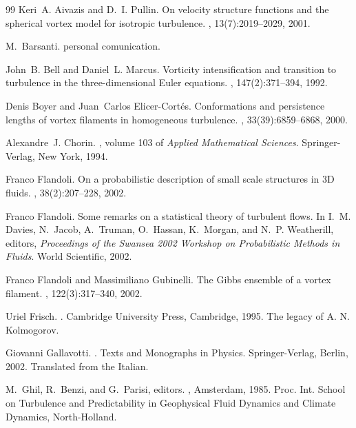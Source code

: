 \documentclass[a4paper,12pt]{article}
\begin{document}
\begin{thebibliography}{99}
Keri~A. Aivazis and D.~I. Pullin. \newblock On velocity
structure functions and the spherical vortex model for isotropic turbulence.
, 13(7):2019--2029, 2001.

M.~Barsanti. \newblock personal comunication.

John~B. Bell and Daniel~L. Marcus. \newblock Vorticity
intensification and transition to turbulence in the three-dimensional {E}uler
equations. , 147(2):371--394, 1992.

Denis Boyer and Juan~Carlos Elicer-Cort{\'{e}}s. \newblock
Conformations and persistence lengths of vortex filaments in homogeneous
turbulence. , 33(39):6859--6868, 2000.

Alexandre~J. Chorin. ,
volume 103 of \emph{Applied Mathematical Sciences}. \newblock Springer-Verlag,
New York, 1994.

Franco Flandoli. \newblock On a probabilistic description of
small scale structures in 3{D} fluids. , 38(2):207--228, 2002.

Franco Flandoli. \newblock Some remarks on a statistical theory
of turbulent flows. \newblock In I.~M. Davies, N.~Jacob, A.~Truman, O.~Hassan,
K.~Morgan, and N.~P. Weatherill, editors, \emph{Proceedings of the Swansea
2002 Workshop on Probabilistic Methods in Fluids}. World Scientific, 2002.

Franco Flandoli and Massimiliano Gubinelli. \newblock The
{G}ibbs ensemble of a vortex filament. , 122(3):317--340, 2002.

Uriel Frisch. . \newblock Cambridge
University Press, Cambridge, 1995. \newblock The legacy of A. N. Kolmogorov.

Giovanni Gallavotti. . \newblock Texts and Monographs in Physics.
Springer-Verlag, Berlin, 2002. \newblock Translated from the Italian.

M.~Ghil, R.~Benzi, and G.~Parisi, editors.
, Amsterdam, 1985.
Proc. Int. School on Turbulence and Predictability in Geophysical Fluid
Dynamics and Climate Dynamics, North-Holland.


\end{thebibliography}
\end{document}
